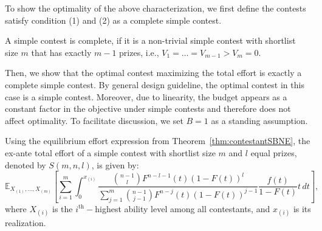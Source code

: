 To show the optimality of the above characterization, we first define the contests satisfy condition (1) and (2) as a complete simple contest. 
\begin{definition}
    A simple contest is complete, if it is a non-trivial simple contest with shortlist size $m$ that has exactly $m-1$ prizes, i.e., $V_1 = \ldots =V_{m-1}>V_m=0$.
\end{definition}

Then, we show that the optimal contest maximizing the total effort is exactly a complete simple contest. By general design guideline, the optimal contest in this case is a simple contest. Moreover, due to linearity, the budget appears as a constant factor in the objective under simple contests and therefore does not affect optimality. To facilitate discussion, we set $B=1$ as a standing assumption.


Using the equilibrium effort expression from Theorem~\ref{thm:contestantSBNE}, the ex-ante total effort of a simple contest with shortlist size $m$ and $l$ equal prizes, denoted by $S(m,n,l)$, is given by:
\[
\mathbb{E}_{X_{(1)}, \ldots, X_{(m)}} \left [\sum_{i=1}^{m}\int_{0}^{x_{(i)}}\frac{\binom{n-1}{l}F^{n-l-1}(t)(1-F(t))^{l}}{\sum_{j=1}^{m}\binom{n-1}{j-1}F^{n-j}(t)(1-F(t))^{j-1}}\frac{f(t)}{1-F(t)} t\, dt \right ],
\]
where $X_{(i)}$ is the $i^{\text{th}}-$highest ability level among all contestants, and $x_{(i)}$ is its realization. 



